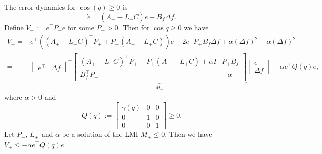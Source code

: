 The error dynamics for $\cos(q)\ge0$ is 
\[
	\dot{e} = \left(A_+-L_+C\right)e + B_f \Delta f.
\]
Define $V_+ := e^\top P_+ e$ for some $P_+>0$. Then for $\cos{q}\ge 0$ we have
\[
	\begin{aligned}
		\dot{V}_+ =& e^\top\left(\left(A_+-L_+C\right)^\top P_+ + P_+ \left(A_+-L_+C\right)\right) e 
		+ 2e^\top P_+ B_f \Delta f + \alpha\left(\Delta f\right)^2 - \alpha\left(\Delta f\right)^2 \\
		=& \begin{bmatrix} e^\top & \Delta f \end{bmatrix}^\top
		\underbrace{\begin{bmatrix} \left(A_+-L_+C\right)^\top P_+ + P_+ \left(A_+-L_+C\right) + \alpha I & P_+B_f \\
		B_f^\top P_+ & -\alpha \end{bmatrix}}_{M_+}
		\begin{bmatrix} e \\ \Delta f \end{bmatrix} - \alpha e^\top Q(q) e,
	\end{aligned}
\]
where $\alpha >0$ and
\[
	Q(q) := \begin{bmatrix} \gamma(q) & 0  & 0 \\ 0 & 1 & 0 \\ 0 & 0 & 1 \end{bmatrix} \ge 0.
\]
Let $P_+$, $L_+$ and $\alpha$ be a solution of the LMI $M_+\le 0$. Then we have $\dot{V}_+\le -\alpha e^\top Q(q) e$.

\bigskip

